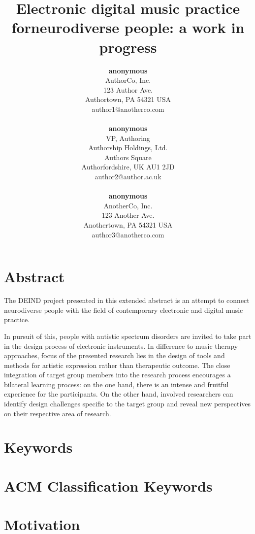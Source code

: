 \documentclass{chi-ext}
\title{Electronic digital music practice for\newline neurodiverse people: a work in progress}
\author{
  \textbf{anonymous} \\
  AuthorCo, Inc. \\
  123 Author Ave. \\
  Authortown, PA 54321 USA \\
  author1@anotherco.com \\
  \\
  \textbf{anonymous} \\
  VP, Authoring \\
  Authorship Holdings, Ltd. \\
  Authors Square \\
  Authorfordshire, UK AU1 2JD \\
  author2@author.ac.uk \\
  \\
  \textbf{anonymous} \\
  AnotherCo, Inc. \\
  123 Another Ave. \\
  Anothertown, PA 54321 USA \\
  author3@anotherco.com \\
}
\begin{document}
\maketitle

\begin{multicols}{2}
  
\makeauthors
\makecopyright

\section{Abstract}
The DEIND project presented in this extended abstract is an attempt to connect neurodiverse people with the field of contemporary electronic and digital music practice. 

In pursuit of this, people with autistic spectrum disorders are invited to take part in the design process of electronic instruments.
In difference to music therapy approaches, focus of the presented research lies in the design of tools and methods for artistic expression rather than therapeutic outcome.
The close integration of target group members into the research process encourages a bilateral learning process: on the one hand, there is an intense and fruitful experience for the participants. On the other hand, involved researchers can identify design challenges specific to the target group and reveal new perspectives on their respective area of research.

\section{Keywords}
\makeatletter \@keywords \makeatother

\section{ACM Classification Keywords}
\makeatletter \@acmclassification \makeatother


\section{Motivation}


\end{multicols}
\end{document}
